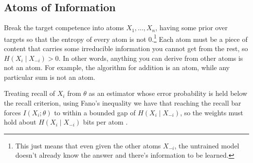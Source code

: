 \documentclass[11pt]{article}
\theoremstyle{plain}
\theoremstyle{definition}
\theoremstyle{remark}
\newcounter{boxrem}
\begin{document}
{\setlength{\fboxsep}{10pt}%
\noindent{}
\vspace{0.75em}}

\subsection{Atoms of Information}
\label{sec:atoms}
Break the target competence into atoms $X_1,\dots,X_n$, having some prior over targets so that the entropy of every atom is not 0.\footnote{This just means that even given the other atoms $X_{-i}$, the untrained model doesn't already know the answer and there's information to be learned.} Each atom must be a piece of content that carries some irreducible information you cannot get from the rest, so $H(X_i\mid X_{-i})>0$. In other words, anything you can derive from other atoms is not an atom. For example, the algorithm for addition is an atom, while any particular sum is not an atom.

Treating recall of $X_i$ from $\theta$ as an estimator whose error probability is held below
the recall criterion, using Fano's inequality we have that reaching the recall bar forces $I(X_i;\theta)$ to within a bounded gap of $H(X_i\mid X_{-i})$, so the weights must hold about $H(X_i\mid X_{-i})$ bits per atom \cite{cover2006}.

\vspace{1em}
\end{document}
